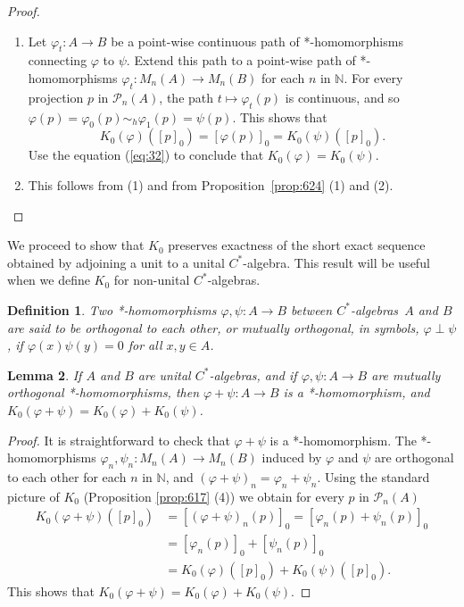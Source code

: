 \documentclass{book}
\newtheorem{definition}{Definition}[section]
\newtheorem{lemma}[definition]{Lemma}
\def\cstar{\(C^*\)-algebra}
\def\cstars{\(C^*\)-algebras}
\begin{document}
\begin{proof}
  \begin{enumerate}
    \item Let \(\varphi_t:A\rightarrow B\) be a point-wise continuous path of *-homomorphisms connecting \(\varphi\) to \(\psi\). 
    Extend this path to a point-wise path of *-homomorphisms \(\varphi_t:M_n(A)\rightarrow M_n(B)\) for each \(n\) in \(\mathbb{N}\).
    For every projection \(p\) in \(\mathcal{P}_n(A)\), the path \(t\mapsto \varphi_t(p)\) is continuous, and so
    \(\varphi(p)=\varphi_0(p)\sim_h\varphi_1(p)=\psi(p)\). This shows that
    \[
      K_0(\varphi)({[p]}_0)={[\varphi(p)]}_0=K_0(\psi)({[p]}_0).
    \]
    Use the equation (\ref{eq:32}) to conclude that \(K_0(\varphi)=K_0(\psi)\).
    \item This follows from (1) and from Proposition~\ref{prop:624} (1) and (2).
  \end{enumerate}
\end{proof}
We proceed to show that \(K_0\) preserves exactness of the short exact sequence obtained by adjoining a unit
to a unital \cstar. This result will be useful when we define \(K_0\) for non-unital \cstars.\par
\begin{definition}
  Two *-homomorphisms \(\varphi,\psi:A\to B\) between \cstars\ \(A\) and \(B\) are said to be \textnormal{orthogonal to each other},
  or mutually orthogonal, in symbols, \(\varphi\perp\psi\), if \(\varphi(x)\psi(y)=0\) for all \(x,y\in A\). 
\end{definition}
\begin{lemma}\label{lemma:627}
  If \(A\) and \(B\) are unital \cstars, and if \(\varphi,\psi:A\to B\) are mutually orthogonal *-homomorphisms,
  then \(\varphi+\psi:A\to B\) is a *-homomorphism, and \(K_0(\varphi+\psi)=K_0(\varphi)+K_0(\psi)\).
\end{lemma}
\begin{proof}
  It is straightforward to check that \(\varphi+\psi\) is a *-homomorphism. The *-homomorphisms
  \(\varphi_n,\psi_n:M_n(A)\to M_n(B)\) induced by \(\varphi\) and \(\psi\) are orthogonal
  to each other for each \(n\) in \(\mathbb{N}\), and \((\varphi+\psi)_n=\varphi_n+\psi_n\).
  Using the standard picture of \(K_0\) (Proposition \ref{prop:617} (4)) we obtain for every \(p\) in \(\mathcal{P}_n(A)\)
  \begin{align*}
    K_0(\varphi+\psi)({[p]}_0)&={[(\varphi+\psi)_n(p)]}_0={[\varphi_n(p)+\psi_n(p)]}_0\\
    &={[\varphi_n(p)]}_0+{[\psi_n(p)]}_0\\
    &=K_0(\varphi)({[p]}_0)+K_0(\psi)({[p]}_0).
  \end{align*}
  This shows that \(K_0(\varphi+\psi)=K_0(\varphi)+K_0(\psi)\).
\end{proof}
\end{document}
